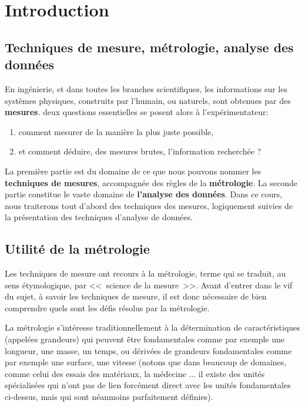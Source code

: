 \chapter{Introduction}
\label{chap:introduction}

\section{Techniques de mesure, métrologie, analyse des données}

En ingénierie, et dans toutes les branches scientifiques, les informations sur les systèmes physiques, construits par l'humain, ou naturels, sont obtenues par des \textbf{mesures}. deux questions essentielles se posent alors à l'expérimentateur:
\begin{enumerate}
    \item comment mesurer de la manière la plus juste possible,
    \item et comment déduire, des mesures brutes, l'information recherchée ?
\end{enumerate}
La première partie est du domaine de ce que nous pouvons nommer les \textbf{techniques de mesures}, accompagnée des règles de la \textbf{métrologie}. La seconde partie constitue le vaste domaine de \textbf{l'analyse des données}. Dans ce cours, nous traiterons tout d'abord des techniques des mesures, logiquement suivies de la présentation des techniques d'analyse de données.

\section{Utilité de la métrologie}

Les techniques de mesure ont recours à la métrologie, terme qui se traduit, au sens étymologique, par \textless\textless\ science de la mesure\ \textgreater\textgreater. Avant d'entrer dans le vif du sujet, à savoir les techniques de mesure, il est donc nécessaire de bien comprendre quels sont les défis résolus par la métrologie.

La métrologie s'intéresse traditionnellement à la détermination de caractéristiques (appelées grandeurs) qui peuvent être fondamentales comme par exemple une longueur, une masse, un temps, ou dérivées de grandeurs fondamentales comme par exemple une surface, une vitesse (notons que dans beaucoup de domaines, comme celui des essais des matériaux, la médecine ... il existe des unités spécialisées qui n'ont pas de lien forcément direct avec les unités fondamentales ci-dessus, mais qui sont néanmoins parfaitement définies).

